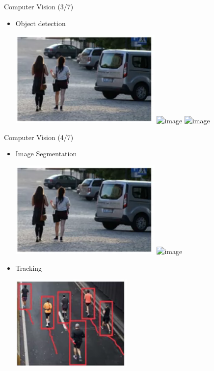 \documentclass[pdf]{beamer}
\theoremstyle{mystyle}
\begin{document}
\begin{frame}{Computer Vision (3/7)}
	\begin{itemize}
		\item Object detection
		\begin{center}
			\includegraphics[scale=.4]{object-detection-1} \qquad \includegraphics<2->[scale=.4]{object-detection-2}
			\bigskip			
			\includegraphics<3->[scale=.4]{object-detection-3}	
		\end{center}
	\end{itemize}
\end{frame}

\begin{frame}{Computer Vision (4/7)}
	\begin{itemize}
		\item Image Segmentation
		\begin{center}
			\includegraphics[scale=.4]{object-detection-1} \qquad \includegraphics<2->[scale=.4]{image-segmentation}	
		\end{center}
		\item<3-> Tracking
		\begin{center}
			\includegraphics[scale=.4]{tracking}
		\end{center}
	\end{itemize}
\end{frame}
\end{document}
